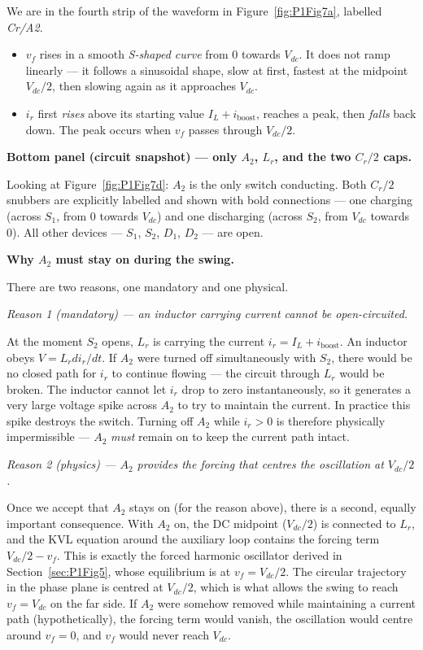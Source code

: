 \documentclass[12pt, a4paper]{article}
\def\,{ }%
\newcommand{\Vdc}{V_{dc}}
\newcommand{\vf}{v_f}
\newcommand{\ir}{i_r}
\newcommand{\IL}{I_L}
\newcommand{\Lr}{L_r}
\newcommand{\Cr}{C_r}
\newcommand{\figref}[1]{Figure~\ref{#1}}
\begin{document}
We are in the fourth strip of the waveform in \figref{fig:P1Fig7a},
labelled \textit{Cr/A2}.
\begin{itemize}
    \item $\vf$ rises in a smooth \emph{S-shaped curve} from 0 towards
          $\Vdc$.  It does not ramp linearly --- it follows a sinusoidal
          shape, slow at first, fastest at the midpoint $\Vdc/2$, then
          slowing again as it approaches $\Vdc$.
    \item $\ir$ first \emph{rises} above its starting value
          $\IL + i_\text{boost}$, reaches a peak, then \emph{falls} back
          down.  The peak occurs when $\vf$ passes through $\Vdc/2$.
\end{itemize}

\medskip
\textbf{Bottom panel (circuit snapshot) — only $A_2$, $\Lr$, and the two
$\Cr/2$ caps.}

Looking at \figref{fig:P1Fig7d}: $A_2$ is the only switch conducting.
Both $\Cr/2$ snubbers are explicitly labelled and shown with bold
connections --- one charging (across $S_1$, from 0 towards $\Vdc$) and one
discharging (across $S_2$, from $\Vdc$ towards 0).
All other devices --- $S_1$, $S_2$, $D_1$, $D_2$ --- are open.

\medskip
\textbf{Why $A_2$ must stay on during the swing.}

There are two reasons, one mandatory and one physical.

\textit{Reason 1 (mandatory) — an inductor carrying current cannot be
open-circuited.}

At the moment $S_2$ opens, $\Lr$ is carrying the current
$\ir = \IL + i_\text{boost}$.
An inductor obeys $V = \Lr\,d\ir/dt$.
If $A_2$ were turned off simultaneously with $S_2$, there would be no
closed path for $\ir$ to continue flowing --- the circuit through $\Lr$
would be broken.
The inductor cannot let $\ir$ drop to zero instantaneously, so it generates
a very large voltage spike across $A_2$ to try to maintain the current.
In practice this spike destroys the switch.
Turning off $A_2$ while $\ir > 0$ is therefore physically impermissible ---
$A_2$ \emph{must} remain on to keep the current path intact.

\textit{Reason 2 (physics) --- $A_2$ provides the forcing that centres the
oscillation at $\Vdc/2$.}

Once we accept that $A_2$ stays on (for the reason above), there is a
second, equally important consequence.
With $A_2$ on, the DC midpoint ($\Vdc/2$) is connected to $\Lr$, and the
KVL equation around the auxiliary loop contains the forcing term
$\Vdc/2 - \vf$.
This is exactly the forced harmonic oscillator derived in
Section~\ref{sec:P1Fig5}, whose equilibrium is at $\vf = \Vdc/2$.
The circular trajectory in the phase plane is centred at $\Vdc/2$, which
is what allows the swing to reach $\vf = \Vdc$ on the far side.
If $A_2$ were somehow removed while maintaining a current path (hypothetically),
the forcing term would vanish, the oscillation would centre around $\vf = 0$,
and $\vf$ would never reach $\Vdc$.
\end{document}

